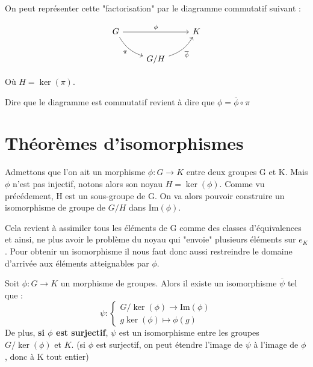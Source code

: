 On peut représenter cette "factorisation" par le diagramme commutatif suivant :

\begin{multicols}{2}
	\[
		\begin{tikzcd}
			G \arrow[rr, "\phi"] \arrow[dr, "\pi" swap, bend right=20] & & K \\
			& G/H \arrow[ur, "\overline{\phi}" swap, bend right=20] &
		\end{tikzcd}
	\]

	Où $H = \ker(\pi)$. 

	\vspace{0.3cm}

	Dire que le diagramme est commutatif revient à dire que $\phi = \overline{\phi} \circ \pi$

\end{multicols}


\section{Théorèmes d'isomorphismes}

Admettons que l'on ait un morphisme $\phi : G \longrightarrow K$ entre deux groupes G et K. 
Mais $\phi$ n'est pas injectif, notons alors son noyau $H = \ker(\phi)$. Comme vu précédement, 
H est un sous-groupe de G. On va alors pouvoir construire un isomorphisme de groupe de $G/H$ dans Im$(\phi)$. 

\vspace{0.5cm}

Cela revient à assimiler tous les éléments de G comme des classes d'équivalences et ainsi, ne plus avoir le problème 
du noyau qui "envoie" plusieurs éléments sur $e_K$. 
Pour obtenir un isomorphisme il nous faut donc aussi restreindre le domaine d'arrivée aux éléments atteignables par $\phi$. 

\begin{theorem}
	Soit $\phi : G \longrightarrow K$ un morphisme de groupes. Alors il existe un isomorphisme $\overline{\psi}$ tel que :
	\[ \psi : 
		\begin{cases}
			G/\ker(\phi) \longrightarrow \text{Im}(\phi) \\ 
			g\ker(\phi) \longmapsto \phi(g)
		\end{cases}
	\]
	De plus, \textbf{si $\phi$ est surjectif}, $\psi$ est un isomorphisme entre les groupes $G/\ker(\phi)$ et $K$.
	(si $\phi$ est surjectif, on peut étendre l'image de $\psi$ à l'image de $\phi$, donc à K tout entier)
\end{theorem}


